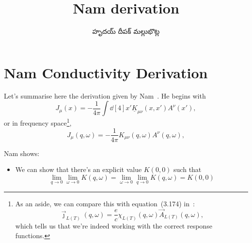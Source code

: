 \documentclass[../main.tex]{subfiles}
\title{Nam derivation}
\author{\begin{telugu}హృదయ్ దీపక్ మల్లుభొట్ల\end{telugu}}
\date{}
\begin{document}
	\onlyinsubfile{\maketitle}
	\section{Nam Conductivity Derivation} \label{sec:Nam}
	Let's summarise here the derivation given by Nam~\autocite{Nam1967}.
	He begins with
	\begin{equation}
		J_\mu(x) = - \frac{1}{4\pi}\int \dd[4]{x'} \underline{K}_{\mu\nu}(x, x') A^\nu(x'),
	\end{equation}
	or in frequency space\footnote{
		As an aside, we can compare this with equation~(3.174) in~\autocite{Giuliani2005}:
		\begin{equation*}
			\vec{\jmath}_{L(T)}(q, \omega) = \frac{e}{c} \chi_{L(T)}(q, \omega) \vec{A}_{L(T)}(q, \omega),
		\end{equation*}
		which tells us that we're indeed working with the correct response functions.
	},
	\begin{equation}
		J_\mu(q, \omega) = - \frac{1}{4\pi} K_{\mu\nu}(q, \omega) A^\nu(q, \omega),
	\end{equation}

	Nam shows:
	\begin{itemize}
		\item We can show that there's an explicit value $K(0, 0)$ such that
			\begin{equation}
				\lim_{q \rightarrow 0} \lim_{\omega \rightarrow 0} K(q, \omega) = \lim_{\omega \rightarrow 0} \lim_{q \rightarrow 0} K(q, \omega) = K(0, 0)
			\end{equation}
	\end{itemize}
\end{document}
